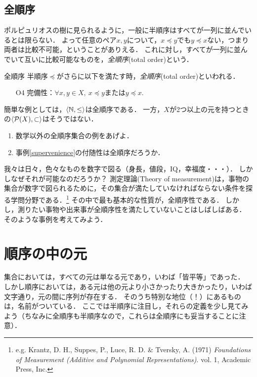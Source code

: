 \documentclass[dvipdfmx,11pt,a4paper]{jsarticle}
\begin{document}
\subsection{全順序}
ポルピュリオスの樹に見られるように，一般に半順序はすべてが一列に並んでいるとは限らない．
よって任意のペア$x, y$について，$x \preceq y $でも$y \preceq x$ない，つまり両者は比較不可能，ということがありえる．
これに対し，すべてが一列に並んでいて互いに比較可能なものを，\emph{全順序}(total order)という．


\begin{itembox}[l]{全順序}
半順序$\preceq$がさらに以下を満たす時，\emph{全順序}(total order)といわれる．
\begin{itemize}
 \item[O4] 完備性：$\forall x, y \in X, \ x \preceq y$または$y \preceq x$. 
\end{itemize}
\end{itembox}
%
簡単な例としては，$\langle \mathbb{N}, \leq \rangle$は全順序である．
一方，$X$が2つ以上の元を持つときの$\langle \mathcal{P}(X), \subset \rangle$はそうではない．

\begin{exercise}
\begin{enumerate}
 \item 数学以外の全順序集合の例をあげよ．
 \item 事例\ref{supervenience}の付随性は全順序だろうか．
\end{enumerate}
\end{exercise}

\begin{example}[測定理論]
我々は日々，色々なものを数字で図る（身長，値段，IQ，幸福度・・・）．
しかしなぜそれが可能なのだろうか？
測定理論(Theory of measurement)は，事物の集合が数字で図られるために，その集合が満たしていなければならない条件を探る学問分野である．\footnote{e.g. Krantz, D. H., Suppes, P., Luce, R. D. \& Tversky, A. (1971) \textit{Foundations of Measurement (Additive and Polynomial Representations)}. vol. 1, Academic Press, Inc.}
その中で最も基本的な性質が，全順序性である．
しかし，測りたい事物や出来事が全順序性を満たしていないことはしばしばある．
そのような事例を考えてみよう．
\end{example}


\section{順序の中の元}
集合においては，すべての元は単なる元であり，いわば「皆平等」であった．
しかし順序においては，ある元は他の元より小さかったり大きかったり，いわば文字通り，元の間に序列が存在する．
そのうち特別な地位（！）にあるものは，名前がついている．
ここでは半順序に注目し，それらの定義を少し見てみよう（ちなみに全順序も半順序なので，これらは全順序にも妥当することに注意）．
\end{document}
